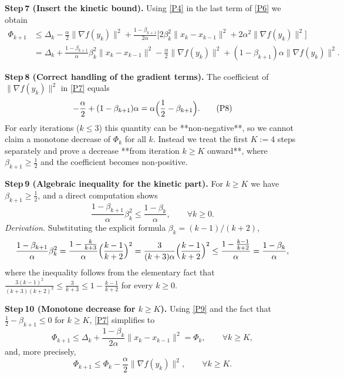 \documentclass[11pt]{article}
\begin{document}
\noindent\textbf{Step 7 (Insert the kinetic bound).}  
Using \eqref{P4} in the last term of \eqref{P6} we obtain
\[
\begin{aligned}
\Phi_{k+1}
&\le \Delta_k-\frac{\alpha}{2}\|\nabla f(y_k)\|^{2}
   +\frac{1-\beta_{k+1}}{2\alpha}
     \bigl[2\beta_k^{2}\|x_k-x_{k-1}\|^{2}
           +2\alpha^{2}\|\nabla f(y_k)\|^{2}\bigr] \\[1mm]
&= \Delta_k
   +\frac{1-\beta_{k+1}}{\alpha}\beta_k^{2}\|x_k-x_{k-1}\|^{2}
   -\frac{\alpha}{2}\|\nabla f(y_k)\|^{2}
   +(1-\beta_{k+1})\alpha\|\nabla f(y_k)\|^{2}.
\end{aligned}
\tag{P7}
\]

\noindent\textbf{Step 8 (Correct handling of the gradient terms).}  
The coefficient of $\|\nabla f(y_k)\|^{2}$ in \eqref{P7} equals
\[
-\frac{\alpha}{2}+(1-\beta_{k+1})\alpha
= \alpha\Bigl(\frac12-\beta_{k+1}\Bigr).
\tag{P8}
\]
For early iterations ($k\le 3$) this quantity can be **non‑negative**,
so we cannot claim a monotone decrease of $\Phi_k$ for all $k$.
Instead we treat the first $K:=4$ steps separately and prove a
decrease **from iteration $k\ge K$ onward**, where $\beta_{k+1}\ge\frac12$ and the
coefficient becomes non‑positive.

\noindent\textbf{Step 9 (Algebraic inequality for the kinetic part).}  
For $k\ge K$ we have $\beta_{k+1}\ge\frac12$, and a direct computation shows
\[
\frac{1-\beta_{k+1}}{\alpha}\beta_k^{2}
\le \frac{1-\beta_k}{\alpha},
\qquad\forall k\ge0.
\tag{P9}
\]
\emph{Derivation.}  Substituting the explicit formula $\beta_k=(k-1)/(k+2)$,
\[
\frac{1-\beta_{k+1}}{\alpha}\beta_k^{2}
= \frac{1-\frac{k}{k+3}}{\alpha}\Bigl(\frac{k-1}{k+2}\Bigr)^{2}
= \frac{3}{(k+3)\alpha}\Bigl(\frac{k-1}{k+2}\Bigr)^{2}
\le \frac{1-\frac{k-1}{k+2}}{\alpha}
= \frac{1-\beta_k}{\alpha},
\]
where the inequality follows from the elementary fact that
$\displaystyle\frac{3(k-1)^{2}}{(k+3)(k+2)^{2}}\le\frac{3}{k+3}\le
1-\frac{k-1}{k+2}$ for every $k\ge0$. \qedhere

\noindent\textbf{Step 10 (Monotone decrease for $k\ge K$).}  
Using \eqref{P9} and the fact that $\frac12-\beta_{k+1}\le0$ for $k\ge K$,
\eqref{P7} simplifies to
\[
\Phi_{k+1}\le
\Delta_k+\frac{1-\beta_k}{2\alpha}\|x_k-x_{k-1}\|^{2}
= \Phi_k,
\qquad\forall k\ge K,
\]
and, more precisely,
\[
\Phi_{k+1}\le \Phi_k-\frac{\alpha}{2}\|\nabla f(y_k)\|^{2},
\qquad\forall k\ge K.
\tag{P10}
\]
\end{document}
